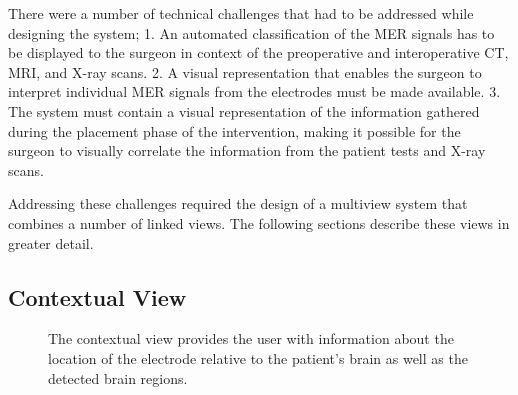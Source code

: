 There were a number of technical challenges that had to be addressed while designing the system;  1. An automated classification of the MER signals has to be displayed to the surgeon in context of the preoperative and interoperative CT, MRI, and X-ray scans.  2. A visual representation that enables the surgeon to interpret individual MER signals from the electrodes must be made available.  3. The system must contain a visual representation of the information gathered during the placement phase of the intervention, making it possible for the surgeon to visually correlate the information from the patient tests and X-ray scans.

Addressing these challenges required the design of a multiview system that combines a number of linked views.  The following sections describe these views in greater detail.


\subsection{Contextual View} \label{contributions:dbs:contextual}
\begin{figure}
  \centering
  \caption{The contextual view provides the user with information about the location of the electrode relative to the patient's brain as well as the detected brain regions.}
  \label{contributions:dbs:contextual}
\end{figure}

